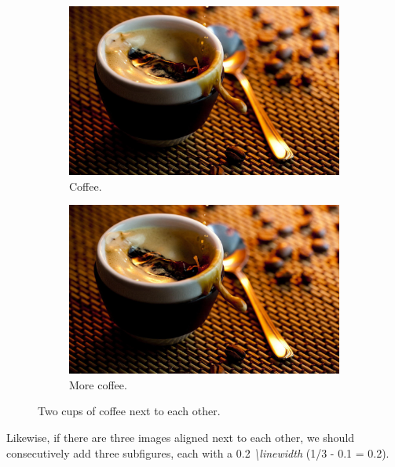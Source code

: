 \documentclass[11pt]{article}  %
\begin{document}
      \begin{figure}[h!]
        \centering
        \begin{subfigure}[h]{0.4\linewidth}  %
          \includegraphics[width=\linewidth]{../resources/coffee.jpg}
          \caption{Coffee.}
        \end{subfigure}
        \begin{subfigure}[h]{0.4\linewidth}  %
          \includegraphics[width=\linewidth]{../resources/coffee.jpg}
          \caption{More coffee.}
        \end{subfigure}
        \caption{Two cups of coffee next to each other.}
        \label{f2}
      \end{figure}

      Likewise, if there are three images aligned next to each other, we should consecutively add three subfigures, each with a 0.2 \textit{\textbackslash linewidth} (1/3 - 0.1 = 0.2).
\end{document}
